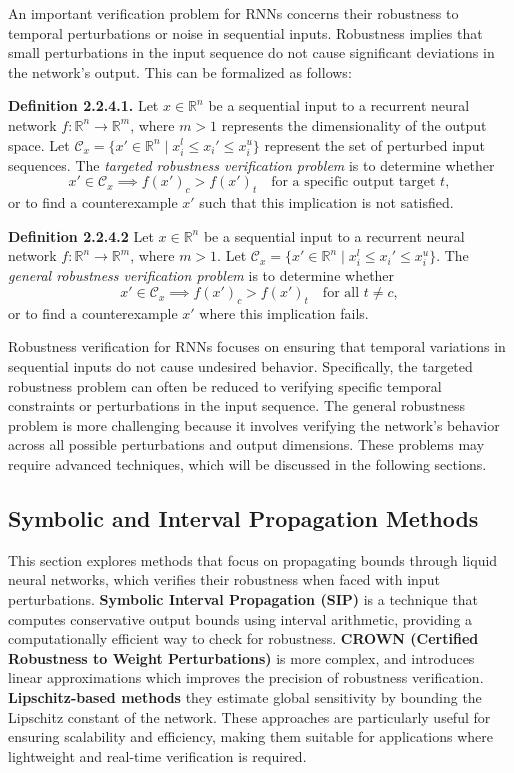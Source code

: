 An important verification problem for RNNs concerns their robustness to temporal perturbations or noise in sequential inputs. Robustness implies that small perturbations in the input sequence do not cause significant deviations in the network's output. This can be formalized as follows:

\textbf{Definition 2.2.4.1.} Let \( x \in \mathbb{R}^n \) be a sequential input to a recurrent neural network \( f : \mathbb{R}^n \to \mathbb{R}^m \), where \( m > 1 \) represents the dimensionality of the output space. Let \( \mathcal{C}_x = \{ x' \in \mathbb{R}^n \mid x_i^l \leq x_i' \leq x_i^u \} \) represent the set of perturbed input sequences. The \textit{targeted robustness verification problem} is to determine whether
\[
x' \in \mathcal{C}_x \implies f(x')_c > f(x')_t \quad \text{for a specific output target } t,
\]
or to find a counterexample \( x' \) such that this implication is not satisfied.

\textbf{Definition 2.2.4.2} Let \( x \in \mathbb{R}^n \) be a sequential input to a recurrent neural network \( f : \mathbb{R}^n \to \mathbb{R}^m \), where \( m > 1 \). Let \( \mathcal{C}_x = \{ x' \in \mathbb{R}^n \mid x_i^l \leq x_i' \leq x_i^u \} \). The \textit{general robustness verification problem} is to determine whether
\[
x' \in \mathcal{C}_x \implies f(x')_c > f(x')_t \quad \text{for all } t \neq c,
\]
or to find a counterexample \( x' \) where this implication fails.

Robustness verification for RNNs focuses on ensuring that temporal variations in sequential inputs do not cause undesired behavior. Specifically, the targeted robustness problem can often be reduced to verifying specific temporal constraints or perturbations in the input sequence. The general robustness problem is more challenging because it involves verifying the network's behavior across all possible perturbations and output dimensions. These problems may require advanced techniques, which will be discussed in the following sections.

\subsection{Symbolic and Interval Propagation Methods}

This section explores methods that focus on propagating bounds through liquid neural networks, which verifies their robustness when faced with input perturbations. \textbf{Symbolic Interval Propagation (SIP)} is a technique that computes conservative output bounds using interval arithmetic, providing a computationally efficient way to check for robustness. \textbf{CROWN (Certified Robustness to Weight Perturbations)} is more complex, and introduces linear approximations which improves the precision of robustness verification. \textbf{Lipschitz-based methods} they estimate global sensitivity by bounding the Lipschitz constant of the network. These approaches are particularly useful for ensuring scalability and efficiency, making them suitable for applications where lightweight and real-time verification is required.

